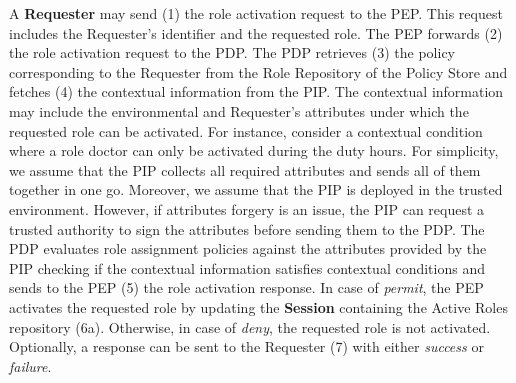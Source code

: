 \documentclass[epsfig,a4paper,11pt,titlepage]{book}
\numberwithin{algorithm}{chapter}
\begin{document}
A \textbf{Requester} may send (1) the role activation request to the \gls{PEP}. This request includes the Requester's identifier and the requested role. The \gls{PEP} forwards (2) the role activation request to the \gls{PDP}. The \gls{PDP} retrieves (3) the policy corresponding to the Requester from the Role Repository of the Policy Store and fetches (4) the contextual information from the \gls{PIP}. The contextual information may include the environmental and Requester's attributes under which the requested role can be activated. For instance, consider a contextual condition where a role doctor can only be activated during the duty hours. For simplicity, we assume that the \gls{PIP} collects all required attributes and sends all of them together in one go. Moreover, we assume that the \gls{PIP} is deployed in the trusted environment. However, if attributes forgery is an issue, the \gls{PIP} can request a trusted authority to sign the attributes before sending them to the \gls{PDP}. The \gls{PDP} evaluates role assignment policies against the attributes provided by the \gls{PIP} checking if the contextual information satisfies contextual conditions and sends to the \gls{PEP} (5) the role activation response. In case of \emph{permit}, the \gls{PEP} activates the requested role by updating the \textbf{Session} containing the Active Roles repository (6a). Otherwise, in case of \emph{deny}, the requested role is not activated. Optionally, a response can be sent to the Requester (7) with either \emph{success} or \emph{failure}.
\end{document}

